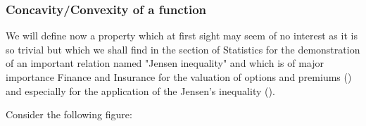 	
	\pagebreak
	\subsubsection{Concavity/Convexity of a function}
	We will define now a property which at first sight may seem of no interest as it is so trivial but which we shall find in the section of Statistics for the demonstration of an important relation named "Jensen inequality" and which is of major importance Finance and Insurance for the valuation of options and premiums () and especially for the application of the Jensen's inequality ().

	Consider the following figure:
	\begin{figure}[H]
		\centering
		\begin{tikzpicture}[x=0.75pt,y=0.75pt,yscale=-1,xscale=1]
		

\end{tikzpicture}
\end{figure}
